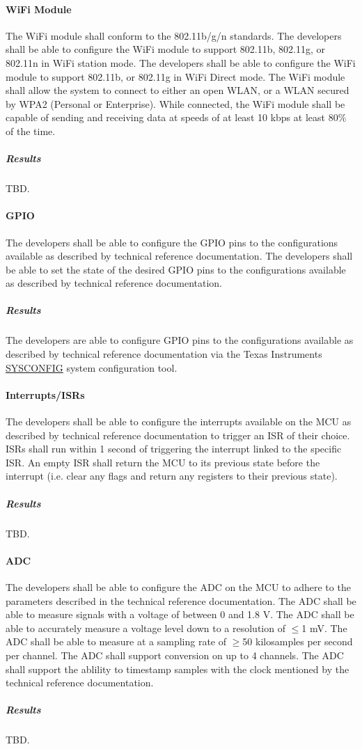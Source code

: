 \paragraph{WiFi Module} The WiFi module shall conform to the 802.11b/g/n
standards. The developers shall be able to configure the WiFi
module to support 802.11b, 802.11g, or 802.11n in WiFi station mode.  The 
developers shall be able to configure the WiFi module to support 802.11b, or
802.11g in WiFi Direct mode. The WiFi module shall allow the system to
connect to either an open WLAN, or a WLAN secured by WPA2 (Personal or
Enterprise). While
connected, the WiFi module shall be capable of sending and receiving
data at speeds of at least 10 kbps at least 80\% of the time.
\subparagraph{Results} TBD.

\paragraph{GPIO} The developers shall be able to configure the GPIO pins to
the configurations available as described by technical reference documentation.
The developers shall be able to set the state of the desired GPIO pins to
the configurations available as described by technical reference documentation.
\subparagraph{Results} The developers are able to configure GPIO pins to the configurations available as described by technical reference documentation via the Texas Instruments \href{https://www.ti.com/tool/SYSCONFIG}{SYSCONFIG} system configuration tool.

\paragraph{Interrupts/ISRs} The developers shall be able to configure
the interrupts available on the MCU as described by technical reference
documentation to trigger an ISR of their choice. ISRs shall run within 1 second
of triggering the interrupt linked to the specific ISR. An empty ISR shall
return the MCU to its previous state before the interrupt (i.e. clear any
flags and return any registers to their previous state).
\subparagraph{Results} TBD.

\paragraph{ADC} The developers shall be able to configure the ADC on the MCU
to adhere to the parameters described in the technical reference documentation.
The ADC shall be able to measure signals with a voltage of between 0 and 1.8 V.
The ADC shall be able to accurately measure a voltage level down to a
resolution of $\leq$1 mV. The ADC shall be able to measure at a sampling rate
of $\geq$50 kilosamples per second per channel. The ADC shall support
conversion on up to 4 channels. The ADC shall support the ablility to timestamp
samples with the clock mentioned by the technical reference documentation.
\subparagraph{Results} TBD.

